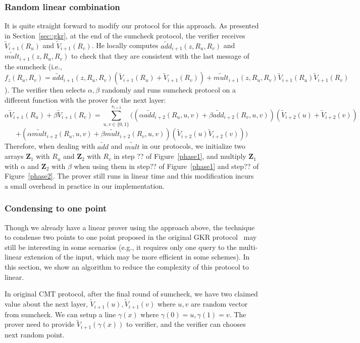 \subsubsection{Random linear combination}
It is quite straight forward to modify our protocol for this approach. As presented in Section~\ref{sec::gkr}, at the end of the sumcheck protocol, the verifier receives $\tilde{V}_{i+1}(R_u)$ and $\tilde{V}_{i+1}(R_v)$.  He locally computes $\tilde{add}_{i+1}(z,R_u,R_v)$ and $\tilde{mult}_{i+1}(z,R_u,R_v)$ to check that they are consistent with the last message of the sumcheck (i.e., $f_z(R_u,R_v) = \tilde{add}_{i+1}(z,R_u,R_v)(\tilde{V}_{i+1}(R_u)+\tilde{V}_{i+1}(R_v))+\tilde{mult}_{i+1}(z,R_u,R_v)\tilde{V}_{i+1}(R_u)\tilde{V}_{i+1}(R_v)$). The verifier then selects $\alpha,\beta$ randomly and runs sumcheck protocol on a different function with the prover for the next layer:
\[
\alpha\tilde{V}_{i+1}(R_u)+\beta\tilde{V}_{i+1}(R_v) = \sum_{u,v\in\{0,1\}}^{s_{i+2}}((\alpha\tilde{add}_{i+2}(R_u,u,v)+\beta\tilde{add}_{i+2}(R_v,u,v))(\tilde{V}_{i+2}(u)+\tilde{V}_{i+2}(v))
\]
\[+(\alpha\tilde{mult}_{i+2}(R_u,u,v)+\beta\tilde{mult}_{i+2}(R_v,u,v))(\tilde{V}_{i+2}(u)\tilde{V}_{i+2}(v)))
\]
Therefore, when dealing with $\tilde{add}$ and $\tilde{mult}$ in our protocols, we initialize two arrays $\textbf{Z}_1$ with $R_u$ and $\textbf{Z}_2$ with $R_v$ in step ?? of Figure~\ref{phase1}, and multiply $\textbf{Z}_1$ with $\alpha$ and $\textbf{Z}_2$ with $\beta$ when using them in step?? of Figure~\ref{phase1} and step?? of Figure~\ref{phase2}. The prover still runs in linear time and this modification incurs a small overhead in practice in our implementation.

\subsubsection{Condensing to one point}

Though we already have a linear prover using the approach above, the technique to condense two points to one point proposed in the original GKR protocol~\cite{GKR} may still be interesting in some scenarios (e.g., it requires only one query to the multi-linear extension of the input, which may be more efficient in some schemes). In this section, we show an algorithm to reduce the complexity of this protocol to linear.

In original CMT protocol, after the final round of sumcheck, we have two claimed value about the next layer, $\tilde{V}_{i+1}(u), \tilde{V}_{i+1}(v)$ where $u, v$ are random vector from sumcheck. We can setup a line $\gamma(x)$ where $\gamma(0) = u, \gamma(1)=v$. The prover need to provide $\tilde{V}_{i+1}(\gamma(x))$ to verifier, and the verifier can chooses next random point.

